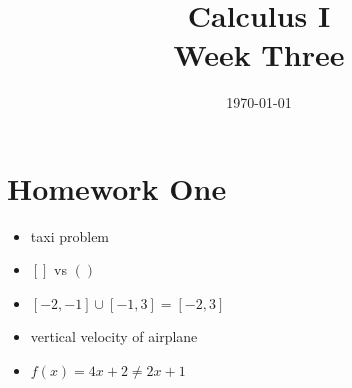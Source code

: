 \documentclass[letterpaper, landscape]{exam}
\author{}
\date{\today}
\title{Calculus I \\ Week Three}
\begin{document}
  \maketitle
  \tableofcontents

  \section{Homework One} 
  \begin{itemize}
    \item taxi problem
    \item $[]$ vs $()$
    \item $[-2, -1] \cup [-1, 3] = [-2, 3]$
    \item vertical velocity of airplane 
    \item $f(x) = 4x + 2 \neq 2x + 1$
  \end{itemize}
\end{document}
